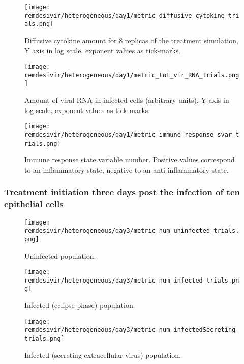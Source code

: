 \begin{figure}[H]
\texttt{[image: remdesivir/heterogeneous/day1/metric\_diffusive\_cytokine\_trials.png]}
\caption{Diffusive cytokine amount for 8 replicas of the treatment simulation, Y axis in log scale, exponent values as tick-marks.\label{fig:app:hetero_regular:day1:diff_cyto}}
\end{figure}

\begin{figure}[H]
\texttt{[image: remdesivir/heterogeneous/day1/metric\_tot\_vir\_RNA\_trials.png]}
\caption{Amount of viral RNA in infected cells (arbitrary units), Y axis in log scale, exponent values as tick-marks.\label{fig:app:hetero_regular:day1:vir_RNA}}
\end{figure}

\begin{figure}[H]
\texttt{[image: remdesivir/heterogeneous/day1/metric\_immune\_response\_svar\_trials.png]}
\caption{Immune response state variable number. Positive values correspond to an inflammatory state, negative to an anti-inflammatory state.\label{fig:app:hetero_regular:day1:immune_var}}
\end{figure}

\subsubsection{Treatment initiation three days post the infection of ten epithelial cells}\label{sup:sec:extra_figures:hetero_regular:day3}

\begin{figure}[H]
\texttt{[image: remdesivir/heterogeneous/day3/metric\_num\_uninfected\_trials.png]}
\caption{Uninfected population.\label{fig:app:hetero_regular:day3:uninf}}
\end{figure}

\begin{figure}[H]
\texttt{[image: remdesivir/heterogeneous/day3/metric\_num\_infected\_trials.png]}
\caption{Infected (eclipse phase) population.\label{fig:app:hetero_regular:day3:inf}}
\end{figure}

\begin{figure}[H]
\texttt{[image: remdesivir/heterogeneous/day3/metric\_num\_infectedSecreting\_trials.png]}
\caption{Infected (secreting extracellular virus) population.\label{fig:app:hetero_regular:day3:infSecr}}
\end{figure}

